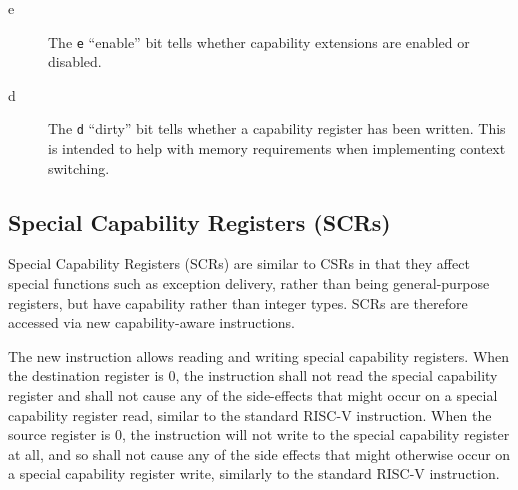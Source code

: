 
\begin{description}
\item [e] The \texttt{e} ``enable'' bit  tells whether capability extensions are enabled or disabled.
\item [d] The \texttt{d} ``dirty'' bit tells whether a capability register has been written. This is intended to help with memory requirements when implementing context switching.  
\end{description}

\subsection{Special Capability Registers (SCRs)}
\label{subsection:cheri-riscv-scrs}

Special Capability Registers (SCRs) are similar to CSRs in that they affect
special functions such as exception delivery, rather than being
general-purpose registers, but have capability rather than integer types.
SCRs are therefore accessed via new capability-aware instructions.

The new  instruction allows reading and writing special
capability registers. When the destination register is 0, the instruction shall
not read the special capability register and shall not cause any of the
side-effects that might occur on a special capability register read, similar to
the standard  RISC-V instruction. When the source register is 0, the
instruction will not write to the special capability register at all, and so
shall not cause any of the side effects that might otherwise occur on a special
capability register write, similarly to the standard  RISC-V
instruction.


